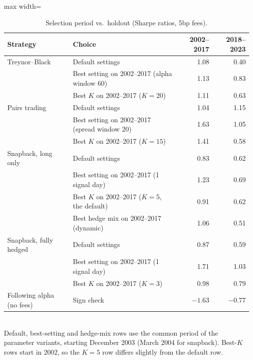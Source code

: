 \documentclass[11pt,letterpaper]{article}
\begin{document}
\begin{table}[!htbp]
    \centering
    \caption{Selection period vs.\ holdout (Sharpe ratios, 5bp fees).}
    \label{tab:holdout}
    \begin{adjustbox}{max width=\linewidth}
        \begin{tabular}{llrr}
            \toprule
            Strategy & Choice & 2002--2017 & 2018--2023 \\
            \midrule
            Treynor--Black & Default settings & 1.08 & 0.40 \\
            & Best setting on 2002--2017 (alpha window 60) & 1.13 & 0.83 \\
            & Best $K$ on 2002--2017 ($K = 20$) & 1.11 & 0.63 \\
            Pairs trading & Default settings & 1.04 & 1.15 \\
            & Best setting on 2002--2017 (spread window 20) & 1.63 & 1.05 \\
            & Best $K$ on 2002--2017 ($K = 15$) & 1.41 & 0.58 \\
            Snapback, long only & Default settings & 0.83 & 0.62 \\
            & Best setting on 2002--2017 (1 signal day) & 1.23 & 0.69 \\
            & Best $K$ on 2002--2017 ($K = 5$, the default) & 0.91 & 0.62 \\
            & Best hedge mix on 2002--2017 (dynamic) & 1.06 & 0.51 \\
            Snapback, fully hedged & Default settings & 0.87 & 0.59 \\
            & Best setting on 2002--2017 (1 signal day) & 1.71 & 1.03 \\
            & Best $K$ on 2002--2017 ($K = 3$) & 0.98 & 0.79 \\
            \midrule
            Following alpha (no fees) & Sign check & $-1.63$ & $-0.77$ \\
            \bottomrule
        \end{tabular}
    \end{adjustbox}
    \\[4pt]
    \small Default, best-setting and hedge-mix rows use the common period of the parameter
    variants, starting December 2003 (March 2004 for snapback). Best-$K$ rows start in 2002, so
    the $K = 5$ row differs slightly from the default row.
\end{table}

\FloatBarrier
\end{document}
